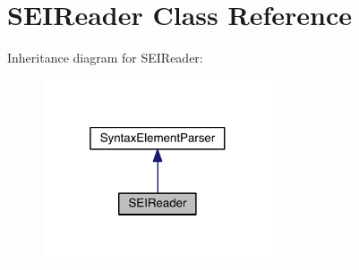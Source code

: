 \hypertarget{class_s_e_i_reader}{}\section{S\+E\+I\+Reader Class Reference}
\label{class_s_e_i_reader}


Inheritance diagram for S\+E\+I\+Reader\+:
\nopagebreak
\begin{figure}[H]
\begin{center}
\leavevmode
\includegraphics[width=193pt]{d3/d14/class_s_e_i_reader__inherit__graph}
\end{center}
\end{figure}


